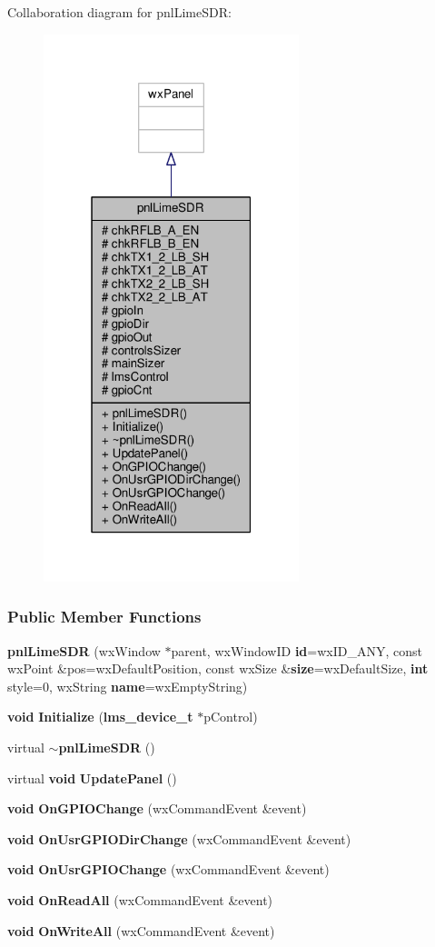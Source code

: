 Collaboration diagram for pnl\+Lime\+S\+DR\+:
\nopagebreak
\begin{figure}[H]
\begin{center}
\leavevmode
\includegraphics[width=211pt]{dc/dec/classpnlLimeSDR__coll__graph}
\end{center}
\end{figure}
\subsubsection*{Public Member Functions}
\begin{DoxyCompactItemize}
\item 
{\bf pnl\+Lime\+S\+DR} (wx\+Window $\ast$parent, wx\+Window\+ID {\bf id}=wx\+I\+D\+\_\+\+A\+NY, const wx\+Point \&pos=wx\+Default\+Position, const wx\+Size \&{\bf size}=wx\+Default\+Size, {\bf int} style=0, wx\+String {\bf name}=wx\+Empty\+String)
\item 
{\bf void} {\bf Initialize} ({\bf lms\+\_\+device\+\_\+t} $\ast$p\+Control)
\item 
virtual {\bf $\sim$pnl\+Lime\+S\+DR} ()
\item 
virtual {\bf void} {\bf Update\+Panel} ()
\item 
{\bf void} {\bf On\+G\+P\+I\+O\+Change} (wx\+Command\+Event \&event)
\item 
{\bf void} {\bf On\+Usr\+G\+P\+I\+O\+Dir\+Change} (wx\+Command\+Event \&event)
\item 
{\bf void} {\bf On\+Usr\+G\+P\+I\+O\+Change} (wx\+Command\+Event \&event)
\item 
{\bf void} {\bf On\+Read\+All} (wx\+Command\+Event \&event)
\item 
{\bf void} {\bf On\+Write\+All} (wx\+Command\+Event \&event)
\end{DoxyCompactItemize}
